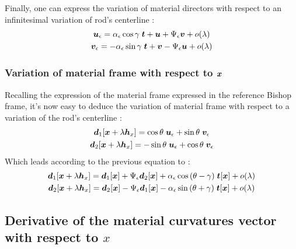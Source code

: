 Finally, one can express the variation of material directors with respect to an infinitesimal variation of rod's centerline :
\begin{subequations}
\begin{gather}
		\boldsymbol{u}_\epsilon = \alpha_\epsilon\cos{\gamma}\;\boldsymbol{t} + \boldsymbol{u} + \Psi_\epsilon\boldsymbol{v} + o(\lambda)
		\\
		\boldsymbol{v}_\epsilon = -\alpha_\epsilon\sin{\gamma}\;\boldsymbol{t} + \boldsymbol{v} - \Psi_\epsilon\boldsymbol{u} + o(\lambda)
\end{gather}
\end{subequations}

\subsubsection{Variation of material frame with respect to $\boldsymbol{x}$}
Recalling the expression of the material frame expressed in the reference Bishop frame, it's now easy to deduce the variation of material frame with respect to a variation of the rod's centerline :
\begin{subequations}
		\begin{gather}
			\boldsymbol{d}_1[\boldsymbol{x}+\lambda \boldsymbol{h}_x] =
			\cos{\theta} \; \boldsymbol{u}_\epsilon + \sin{\theta} \; \boldsymbol{v}_\epsilon\\
			\boldsymbol{d}_2[\boldsymbol{x}+\lambda \boldsymbol{h}_x] =
			-\sin{\theta} \; \boldsymbol{u}_\epsilon + \cos{\theta} \; \boldsymbol{v}_\epsilon
		\end{gather}
\end{subequations}
Which leads according to the previous equation to :
\begin{subequations}
	\begin{gather}
		\boldsymbol{d}_1[\boldsymbol{x}+\lambda \boldsymbol{h}_x] = \boldsymbol{d}_1[\boldsymbol{x}] + \Psi_\epsilon\boldsymbol{d}_2[\boldsymbol{x}] + \alpha_\epsilon\cos{(\theta-\gamma)}\;\boldsymbol{t}[\boldsymbol{x}] + o(\lambda) \\
		\boldsymbol{d}_2[\boldsymbol{x}+\lambda \boldsymbol{h}_x] = \boldsymbol{d}_2[\boldsymbol{x}] - \Psi_\epsilon\boldsymbol{d}_1[\boldsymbol{x}] - \alpha_\epsilon\sin{(\theta+\gamma)}\;\boldsymbol{t}[\boldsymbol{x}] + o(\lambda)
		\end{gather}
\end{subequations}

\subsection{Derivative of the material curvatures vector with respect to $x$}

